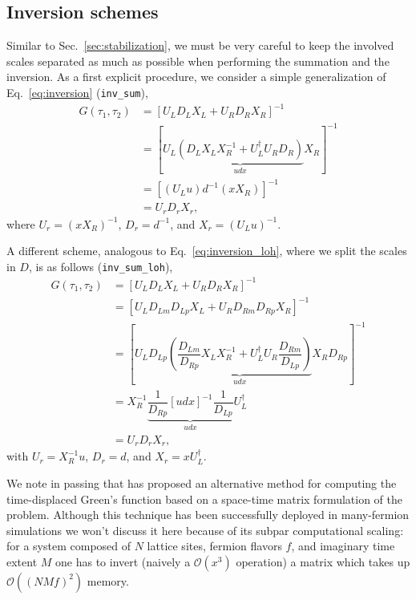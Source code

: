 \documentclass[submission, Phys]{SciPost}
\begin{document}
\subsection{Inversion schemes}
Similar to Sec.~\ref{sec:stabilization}, we must be very careful to keep the involved scales separated as much as possible when performing the summation and the inversion.
As a first explicit procedure, we consider a simple generalization of Eq.~\ref{eq:inversion} (\texttt{inv\_sum}),
\begin{align}
	G(\tau_1, \tau_2) &= [U_L D_L X_L + U_R D_R X_R]^{-1} \nonumber\\
	&= [U_L \underbrace{(D_L X_L X_R^{-1} + U_L^\dagger U_R D_R)}_{udx} X_R ]^{-1} \nonumber\\
	&= [(U_L u) d^{-1} (x X_R)]^{-1} \label{eq:inversion_tdgf}\\
	&= U_r D_r X_r, \nonumber 
\end{align}
where $U_r = (x X_R)^{-1}$, $D_r = d^{-1}$, and $X_r = (U_L u)^{-1}$.

A different scheme, analogous to Eq.~\ref{eq:inversion_loh}, where we split the scales in $D$, is as follows (\texttt{inv\_sum\_loh}), \cite{Loh2005}
\begin{align}
	G(\tau_1, \tau_2) &= [U_L D_L X_L + U_R D_R X_R]^{-1} \nonumber\\
	&= [U_L D_{Lm} D_{Lp} X_L + U_R D_{Rm} D_{Rp} X_R]^{-1} \nonumber\\
	&= \left[U_L D_{Lp} \underbrace{\left( \dfrac{D_{Lm}}{D_{Rp}} X_L X_R^{-1} + U_L^\dagger U_R \dfrac{D_{Rm}}{D_{Lp}} \right)}_{udx} X_R D_{Rp} \right]^{-1} \nonumber\\
	&= X_R^{-1} \underbrace{\dfrac{1}{D_{Rp}} [udx]^{-1} \dfrac{1}{D_{Lp}}}_{udx} U_L^\dagger \label{eq:inversion_tdgf_loh} \\
	&= U_r D_r X_r, \nonumber
\end{align}
with $U_r = X_R^{-1} u$, $D_r = d$, and $X_r = x U_L^\dagger$.

We note in passing that \citet{Hirsch1988} has proposed an alternative method for computing the time-displaced Green's function based on a space-time matrix formulation of the problem. Although this technique has been successfully deployed in many-fermion simulations we won't discuss it here because of its subpar computational scaling: for a system composed of $N$ lattice sites, fermion flavors $f$, and imaginary time extent $M$ one has to invert (naively a $\mathcal{O}(x^3)$ operation) a matrix which takes up $\mathcal{O}((NMf)^2)$ memory.
\end{document}

